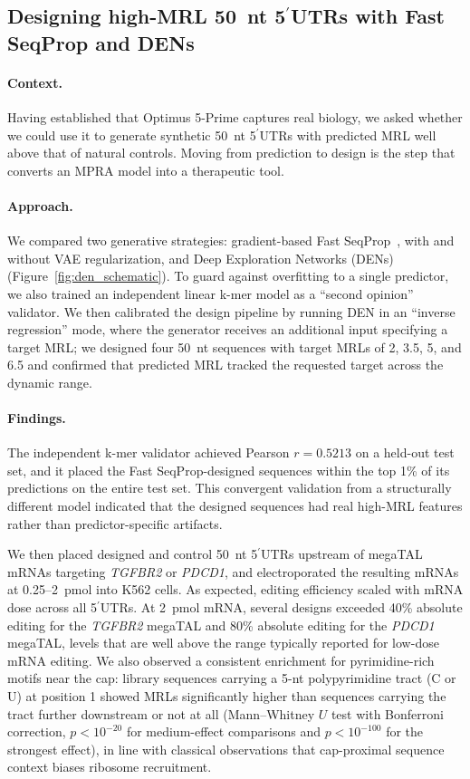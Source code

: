 \documentclass[11pt]{article}
\begin{document}
\subsection{Designing high-MRL 50~nt 5$^\prime$UTRs with Fast SeqProp and DENs}

\paragraph{Context.} Having established that Optimus 5-Prime captures
real biology, we asked whether we could use it to generate synthetic
50~nt 5$^\prime$UTRs with predicted MRL well above that of natural
controls. Moving from prediction to design is the step that converts
an MPRA model into a therapeutic tool.

\paragraph{Approach.} We compared two generative strategies:
gradient-based Fast SeqProp~\citep{linder2021fastseqprop}, with and
without VAE regularization, and Deep Exploration Networks
(DENs)~\citep{linder2020den} (Figure~\ref{fig:den_schematic}). To
guard against overfitting to a single predictor, we also trained an
independent linear k-mer model as a ``second opinion'' validator.
We then calibrated the design pipeline by running DEN in an
``inverse regression'' mode, where the generator receives an
additional input specifying a target MRL; we designed four 50~nt
sequences with target MRLs of 2, 3.5, 5, and 6.5 and confirmed that
predicted MRL tracked the requested target across the dynamic range.

\paragraph{Findings.} The independent k-mer validator achieved Pearson
$r = 0.5213$ on a held-out test set, and it placed the Fast
SeqProp-designed sequences within the top 1\% of its predictions on
the entire test set. This convergent validation from a structurally
different model indicated that the designed sequences had real
high-MRL features rather than predictor-specific artifacts.

We then placed designed and control 50~nt 5$^\prime$UTRs upstream of
megaTAL mRNAs targeting \emph{TGFBR2} or \emph{PDCD1}, and
electroporated the resulting mRNAs at 0.25--2~pmol into K562 cells. As
expected, editing efficiency scaled with mRNA dose across all
5$^\prime$UTRs. At 2~pmol mRNA, several designs exceeded 40\% absolute
editing for the \emph{TGFBR2} megaTAL and 80\% absolute editing for the
\emph{PDCD1} megaTAL, levels that are well above the range typically
reported for low-dose mRNA editing. We also observed a consistent
enrichment for pyrimidine-rich motifs near the cap: library sequences
carrying a 5-nt polypyrimidine tract (C or U) at position 1 showed
MRLs significantly higher than sequences carrying the tract further
downstream or not at all (Mann--Whitney $U$ test with Bonferroni
correction, $p < 10^{-20}$ for medium-effect comparisons and
$p < 10^{-100}$ for the strongest effect), in line with classical
observations that cap-proximal sequence context biases ribosome
recruitment.
\end{document}
